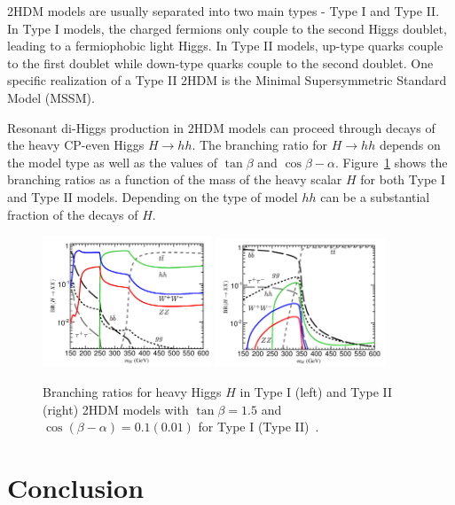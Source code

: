 2HDM models are usually separated into two main types - Type I and Type II. In Type I models, the charged fermions only couple to the second Higgs doublet, leading to a fermiophobic light Higgs. In Type II models, up-type quarks couple to the first doublet while down-type quarks couple to the second doublet. One specific realization of a Type II 2HDM is the Minimal Supersymmetric Standard Model (MSSM).

Resonant di-Higgs production in 2HDM models can proceed through decays of the heavy CP-even Higgs $H\to hh$. The branching ratio for $H\to hh$ depends on the model type as well as the values of $\tan{\beta}$ and $\cos{\beta - \alpha}$. Figure~\ref{fig:H_BR} shows the branching ratios as a function of the mass of the heavy scalar $H$ for both Type I and Type II models. Depending on the type of model $hh$ can be a substantial fraction of the decays of $H$. 

\begin{figure}[h!]
  \centering
  \captionsetup{justification=centering}

  \includegraphics[width=0.45\textwidth]{figures/H_BR_type1}
  \includegraphics[width=0.45\textwidth]{figures/H_BR_type2}
   \caption{Branching ratios for heavy Higgs $H$ in Type I (left) and Type II (right) 2HDM models with $\tan{\beta} = 1.5$ and $\cos(\beta - \alpha) = 0.1 (0.01)$ for Type I (Type II)~\cite{2HDM3}.}
  \label{fig:H_BR}
\end{figure}

\section{Conclusion}

